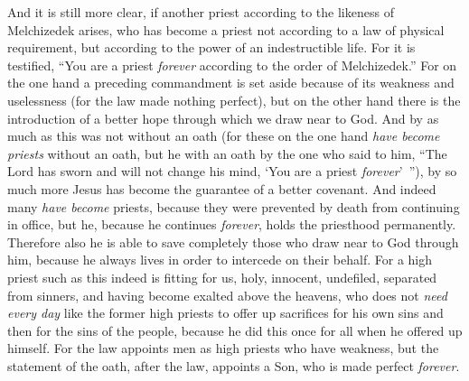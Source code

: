 \begin{biblechapter}
\verse And it is still more clear, if another priest according to the likeness of Melchizedek arises,
\verse who has become a priest not according to a law of physical requirement, but according to the power of an indestructible life.
\verse For it is testified, “You are a priest \textit{forever} according to the order of Melchizedek.”
\verse For on the one hand a preceding commandment is set aside because of its weakness and uselessness
\verse (for the law made nothing perfect), but on the other hand there is the introduction of a better hope through which we draw near to God.
\verse And by as much as this was not without an oath (for these on the one hand \textit{have become priests} without an oath,
\verse but he with an oath by the one who said to him, “The Lord has sworn and will not change his mind, 
‘You are a priest \textit{forever}’ ”),
\verse by so much more Jesus has become the guarantee of a better covenant.
\verse And indeed many \textit{have become} priests, because they were prevented by death from continuing in office,
\verse but he, because he continues \textit{forever}, holds the priesthood permanently.
\verse Therefore also he is able to save completely those who draw near to God through him, because he always lives in order to intercede on their behalf.
\verse For a high priest such as this indeed is fitting for us, holy, innocent, undefiled, separated from sinners, and having become exalted above the heavens,
\verse who does not \textit{need every day} like the former high priests to offer up sacrifices for his own sins and then for the sins of the people, because he did this once for all when he offered up himself.
\verse For the law appoints men as high priests who have weakness, but the statement of the oath, after the law, appoints a Son, who is made perfect \textit{forever}.
\end{biblechapter}

